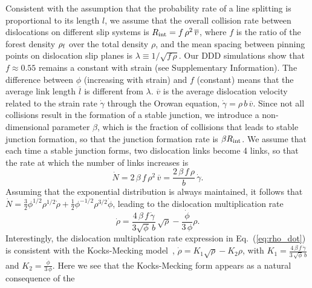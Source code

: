 \documentclass[%
reprint,
 amsmath,amssymb,
 aps,
superscriptaddress,
]{revtex4-1}
\begin{document}
Consistent with the assumption that the probability rate of a line splitting is
proportional to its length $l$, we assume that the overall collision rate
between dislocations on different slip systems is $R_{\rm int} =
f\,\rho^2\,\overline{v}$, where 
%
$f$ is the ratio of the forest density $\rho_{\rm f}$ over the total density
$\rho$, and the mean spacing between pinning points on dislocation slip planes
is $\lambda \equiv 1/\sqrt{f\,\rho}$.
%
Our DDD simulations show that $f \approx 0.55$ remains a constant with
strain (see Supplementary Information).
%
The difference between $\phi$ (increasing with strain) and $f$ (constant)
means that the average link length $\overline{l}$ is
different from $\lambda$.
%
$\overline{v}$ is the average dislocation velocity related to the strain rate
$\dot{\gamma}$ through the Orowan equation, $\dot{\gamma} =
\rho\,b\,\overline{v}$.
%
%
%
Since not all collisions result in the formation of a stable junction,
%
we introduce a non-dimensional parameter $\beta$, which is the fraction
of collisions that leads to stable junction formation, so that the junction
formation rate is $\beta R_{\rm int}$.
%
We assume that each time a stable junction forms, two dislocation links become 4 
links, so that the rate at which the number of links increases is
%
\begin{equation}
 \dot{N} = 2 \, \beta\,f\,\rho^2\,\overline{v} 
             = \frac{2\,\beta\,f\,\rho}{b}  \, \dot{\gamma}.
 \label{eq:Ndot}
\end{equation}
%
Assuming that the exponential distribution is always maintained, it follows that 
$\dot{N} = \frac{3}{2}\phi^{1/2}\rho^{1/2}\dot{\rho}+
\frac{1}{2}\phi^{-1/2}\rho^{3/2}\dot{\phi}$, leading to the dislocation 
multiplication rate
%
\begin{equation}
\dot{\rho} = \frac{4\,\beta\,f\,\dot{\gamma}}{3\sqrt{\phi}\,b}\, \sqrt{\rho} 
   - \frac{\dot{\phi}}{3\,\phi}\rho.
  \label{eq:rho_dot}
\end{equation}
%
Interestingly, the dislocation multiplication rate expression in
Eq.~(\ref{eq:rho_dot}) is consistent with the Kocks-Mecking model~\cite{Kocks2003},
$\dot{\rho} = K_1 \sqrt{\rho} - K_2 \rho$, with 
$K_1 =  \frac{4\,\beta\,f\,\dot{\gamma}}{3\,\sqrt{\phi}\,b}$
and $K_2 = \frac{\dot{\phi}}{3\,\phi}$.
%
Here we see that the Kocks-Mecking form appears as a natural consequence of the 
\end{document}
